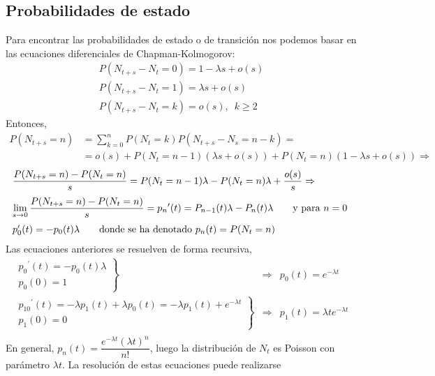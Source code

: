 \subsection{Probabilidades de estado}
Para encontrar las probabilidades de estado o de transici\'{o}n nos
podemos basar en las ecuaciones diferenciales de
Chapman-Kolmogorov:
\[
\begin{array}{l}
P(N_{t+s}-N_t=0)=1-\lambda s+o(s)\\
P(N_{t+s}-N_t=1)=\lambda s+o(s)\\
P(N_{t+s}-N_t=k)=o(s),\enspace k\geq 2
\end{array}
\]
Entonces,
\[
\begin{array}{ll}
P(N_{t+s}=n)&=\displaystyle\sum_{k=0}^n
P(N_t=k)P(N_{t+s}-N_s=n-k)=
\\
&=o(s)+P(N_t=n-1)(\lambda s +o(s))+ P(N_t=n)(1-\lambda
s+o(s))\Rightarrow
\end{array}
\]
\[
\begin{array}{l}
\dfrac{P(N_{t+s}=n)-P(N_t=n)}{s}=P(N_t=n-1)\lambda-P(N_t=n)\lambda+\dfrac{o(s)}{s}
\Rightarrow \hbox{}\hfill\\[10pt]
\displaystyle\lim_{s\to
0}\dfrac{P(N_{t+s}=n)-P(N_t=n)}{s}={p_n}^{\prime}(t)=P_{n-1}(t)\lambda-P_n(t)\lambda
\hspace{20pt}\text{y para $n=0$ }\\[10pt]
p_0^\prime(t)=-p_0(t)\lambda \hspace{20pt}\text{donde se ha
denotado $p_n(t)=P(N_t=n)$}
\end{array}
\]
Las ecuaciones anteriores se resuelven de forma recursiva,
\[
\begin{array}{lll}
\left.\begin{array}{l}
{p_0}^\prime(t)=-p_0(t)\lambda\\
p_0(0)=1
\end{array}\right\}
&\Rightarrow &p_0(t)=e^{-\lambda t}\\[5pt]
%
\left.\begin{array}{l} {p_{10}}^\prime(t)=-\lambda p_1(t) +
\lambda p_0(t)=-\lambda p_1(t) +
e^{-\lambda t}\\
p_1(0)=0
\end{array}\right\}
&\Rightarrow &p_1(t)=\lambda t e^{-\lambda t}\\[5pt]
%
\end{array}
\]
En general, $p_n(t)=\dfrac{e^{-\lambda t}(\lambda t)^n}{n!}$,
luego la distribuci\'{o}n de $N_t$ es Poisson con par\'{a}metro $\lambda
t$. La resoluci\'{o}n de estas ecuaciones puede realizarse
